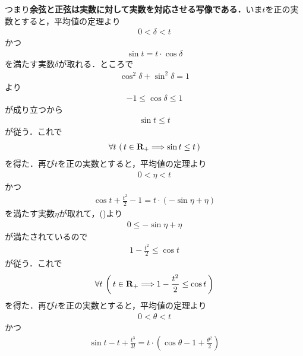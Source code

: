 	\begin{sketch}
		
	\end{sketch}
	
	
	つまり{\bf 余弦と正弦は実数に対して実数を対応させる写像である．}いま$t$を正の実数とすると，平均値の定理より
	\begin{align}
		0 < \delta < t
	\end{align}
	かつ
	\begin{align}
		\sin{t} = t \cdot \cos{\delta}
	\end{align}
	を満たす実数$\delta$が取れる．ところで
	\begin{align}
		\cos^2{\delta} + \sin^2{\delta} = 1
	\end{align}
	より
	\begin{align}
		-1 \leq \cos{\delta} \leq 1
	\end{align}
	が成り立つから
	\begin{align}
		\sin{t} \leq t
	\end{align}
	が従う．これで
	\begin{align}
		\forall t\, \left(\, t \in \mathbf{R}_{+} \Longrightarrow \sin{t} \leq t\, \right)
		\label{fom:existence_of_pi_1}
	\end{align}
	を得た．再び$t$を正の実数とすると，平均値の定理より
	\begin{align}
		0 < \eta < t
	\end{align}
	かつ
	\begin{align}
		\cos{t} + \frac{t^2}{2} - 1 = t \cdot (-\sin{\eta} + \eta)
	\end{align}
	を満たす実数$\eta$が取れて，()より
	\begin{align}
		0 \leq -\sin{\eta} + \eta
	\end{align}
	が満たされているので
	\begin{align}
		1 - \frac{t^2}{2} \leq \cos{t}
	\end{align}
	が従う．これで
	\begin{align}
		\forall t\, \left(\, t \in \mathbf{R}_{+} 
		\Longrightarrow 1 - \frac{t^2}{2} \leq \cos{t}\, \right)
		\label{fom:existence_of_pi_2}
	\end{align}
	を得た．再び$t$を正の実数とすると，平均値の定理より
	\begin{align}
		0 < \theta < t
	\end{align}
	かつ
	\begin{align}
		\sin{t} - t + \frac{t^3}{3!} = t \cdot \left(\cos{\theta} - 1 + \frac{\theta^2}{2}\right)
	\end{align}
